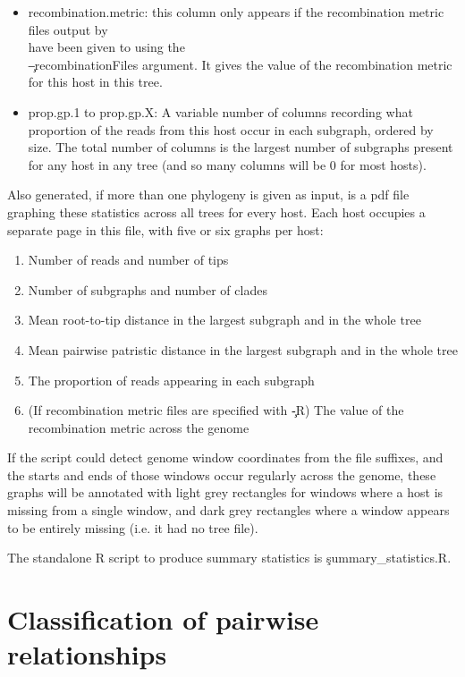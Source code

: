 \begin{itemize}
\item recombination.metric: this column only appears if the recombination metric files output by \\\pmt have been given to \pat using the \\\c{--recombinationFiles} argument.
It gives the value of the recombination metric for this host in this tree.
\item prop.gp.1 to prop.gp.X: A variable number of columns recording what proportion of the reads from this host occur in each subgraph, ordered by size.
The total number of columns is the largest number of subgraphs present for any host in any tree (and so many columns will be 0 for most hosts).
\end{itemize}

Also generated, if more than one phylogeny is given as input, is a pdf file graphing these statistics across all trees for every host.
Each host occupies a separate page in this file, with five or six graphs per host:
\begin{enumerate}
\item Number of reads and number of tips
\item Number of subgraphs and number of clades
\item Mean root-to-tip distance in the largest subgraph and in the whole tree
\item Mean pairwise patristic distance in the largest subgraph and in the whole tree
\item The proportion of reads appearing in each subgraph
\item (If recombination metric files are specified with \c{-R}) The value of the recombination metric across the genome
\end{enumerate}

If the script could detect genome window coordinates from the file suffixes, and the starts and ends of those windows occur regularly across the genome, these graphs will be annotated with light grey rectangles for windows where a host is missing from a single window, and dark grey rectangles where a window appears to be entirely missing (i.e. it had no tree file).

The standalone R script to produce summary statistics is \c{summary\_statistics.R}.

\section{Classification of pairwise relationships}\label{sec:Classification}

